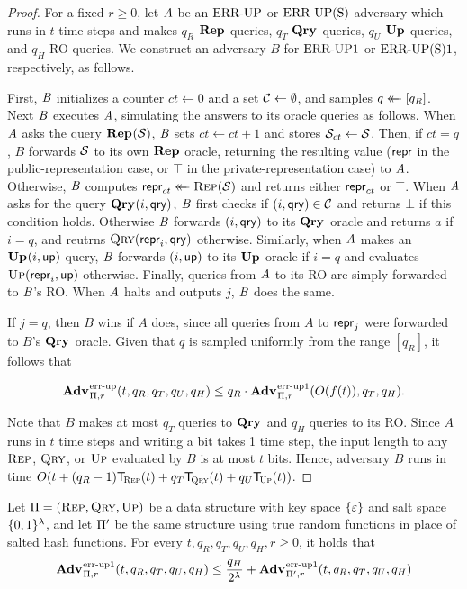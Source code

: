 \begin{proof}For a fixed $r \ge 0$, let $\mathit{A}$ be an $\textnormal{ERR\mbox{-}UP}$ or $\textnormal{ERR\mbox{-}UP(S)}$ adversary which runs in $t$ time steps and makes $q_R$ $\mathbf{Rep}\hspace{0.5pt}$ queries, $q_T$ $\mathbf{Qry}\hspace{0.5pt}$ queries, $q_U$ $\mathbf{Up}\hspace{0.5pt}$ queries, and $q_H$ RO queries. We construct an adversary $B$ for $\textnormal{ERR\mbox{-}UP}1$ or $\textnormal{ERR\mbox{-}UP(S)}1$, respectively, as follows.

First, $\mathit{B}$ initializes a counter $ct \gets 0$ and a set $\mathcal{C} \gets \emptyset$, and samples $q \mathrel{\leftarrow\mkern-14mu\leftarrow} [q_R]$. Next $\mathit{B}$ executes $\mathit{A}$, simulating the answers to its oracle queries as follows. When $\mathit{A}$ asks the query $\mathbf{Rep}\hspace{0.5pt}(\mathcal{S})$, $\mathit{B}$ sets $ct \gets ct + 1$ and stores $\mathcal{S}_{ct} \gets \mathcal{S}$. Then, if $ct = q$, $B$ forwards $\mathcal{S}$ to its own $\mathbf{Rep}\hspace{0.5pt}$ oracle, returning the resulting value ($\mathsf{repr}$ in the public-representation case, or $\top$ in the private-representation case) to $\mathit{A}$. Otherwise, $\mathit{B}$ computes $\mathsf{repr}_{ct} \mathrel{\leftarrow\mkern-14mu\leftarrow} \textsc{Rep}(\mathcal{S})$ and returns either $\mathsf{repr}_{ct}$ or $\top$. When $\mathit{A}$ asks for the query $\mathbf{Qry}\hspace{0.5pt}(i,\mathsf{qry})$, $\mathit{B}$ first checks if $(i,\mathsf{qry}) \in \mathcal{C}$ and returns $\bot$ if this condition holds. Otherwise $\mathit{B}$ forwards $(i,\mathsf{qry})$ to its $\mathbf{Qry}\hspace{0.5pt}$ oracle and returns $a$ if $i = q$, and reutrns $\textsc{Qry}(\mathsf{repr}_i,\mathsf{qry})$ otherwise. Similarly, when $\mathit{A}$ makes an $\mathbf{Up}\hspace{0.5pt}(i,\mathsf{up})$ query, $\mathit{B}$ forwards $(i,\mathsf{up})$ to its $\mathbf{Up}\hspace{0.5pt}$ oracle if $i = q$ and evaluates $\textsc{Up}(\mathsf{repr}_i,\mathsf{up})$ otherwise. Finally, queries from $\mathit{A}$ to its RO are simply forwarded to $\mathit{B}$'s RO. When $\mathit{A}$ halts and outputs $j$, $\mathit{B}$ does the same.

If $j = q$, then $B$ wins if $A$ does, since all queries from $A$ to $\mathsf{repr}_j$ were forwarded to $B$'s $\mathbf{Qry}\hspace{0.5pt}$ oracle. Given that $q$ is sampled uniformly from the range $[q_R]$, it follows that

$$\Adv{\errep}_{\struct,r}(t, q_R, q_T, q_U, q_H) \leq q_R\cdot\Adv{\errep1}_{\struct,r}(O(f(t)), q_T, q_H).$$

Note that $B$ makes at most $q_T$ queries to $\mathbf{Qry}\hspace{0.5pt}$ and $q_H$ queries to its RO. Since $A$ runs in $t$ time steps and writing a bit takes 1 time step, the input length to any $\textsc{Rep}$, $\textsc{Qry}$, or $\textsc{Up}$ evaluated by $B$ is at most $t$ bits. Hence, adversary $B$ runs in time $O(t+(q_R-1)\ticks(\Rep,t)+q_T\ticks(\Qry,t)+q_U\ticks(\Up,t))$.\missingqed
\end{proof}

\begin{lemma}\label{lemma:salttorand}
  Let $\mathrm{\Pi} = (\textsc{Rep}, \textsc{Qry}, \textsc{Up})$ be a data structure with key space $\{\varepsilon\}$ and salt space $\{0,1\}^\lambda$, and let $\mathrm{\Pi}'$ be the same structure using true random functions in place of salted hash functions. For every $t, q_R, q_T, q_U, q_H, r \geq 0$, it holds that
  \[
    \Adv{\errep1}_{\struct,r}(t, q_R, q_T, q_U, q_H) \leq \frac{q_H}{2^\lambda} + \Adv{\errep1}_{\struct',r}(t, q_R, q_T, q_U, q_H)
  \]
\end{lemma}

